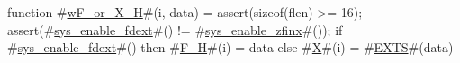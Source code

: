 function #\hyperref[sailRISCVzwFzyorzyXzyH]{wF\_or\_X\_H}#(i, data) = {
  assert(sizeof(flen) >= 16);
  assert(#\hyperref[sailRISCVzsyszyenablezyfdext]{sys\_enable\_fdext}#() != #\hyperref[sailRISCVzsyszyenablezyzzfinx]{sys\_enable\_zfinx}#());
  if   #\hyperref[sailRISCVzsyszyenablezyfdext]{sys\_enable\_fdext}#()
  then #\hyperref[sailRISCVzFzyH]{F\_H}#(i) = data
  else #\hyperref[sailRISCVzX]{X}#(i) = #\hyperref[sailRISCVzEXTS]{EXTS}#(data)
}

